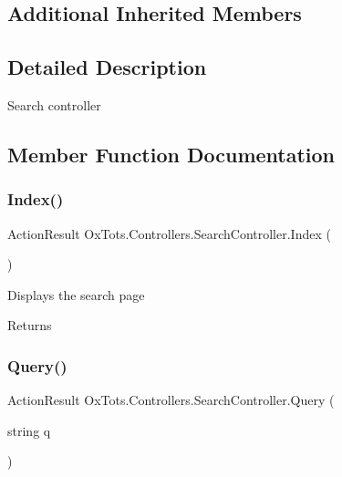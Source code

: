 \subsection*{Additional Inherited Members}


\subsection{Detailed Description}
Search controller 



\subsection{Member Function Documentation}
\mbox{\label{class_ox_tots_1_1_controllers_1_1_search_controller_a53611fc0cd421bce0a04ed1dfe6a8780}} 
\subsubsection{\texorpdfstring{Index()}{Index()}}
{\footnotesize\ttfamily Action\+Result Ox\+Tots.\+Controllers.\+Search\+Controller.\+Index (\begin{DoxyParamCaption}{ }\end{DoxyParamCaption})\hspace{0.3cm}{\ttfamily [inline]}}



Displays the search page 

\begin{DoxyReturn}{Returns}

\end{DoxyReturn}
\mbox{\label{class_ox_tots_1_1_controllers_1_1_search_controller_a4c64133bbd7e03d9d2ca047d09fa0f82}} 
\subsubsection{\texorpdfstring{Query()}{Query()}}
{\footnotesize\ttfamily Action\+Result Ox\+Tots.\+Controllers.\+Search\+Controller.\+Query (\begin{DoxyParamCaption}\item[{string}]{q }\end{DoxyParamCaption})\hspace{0.3cm}{\ttfamily [inline]}}



